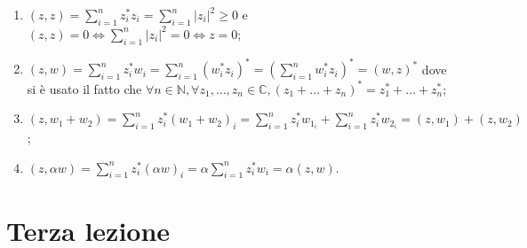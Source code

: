 \documentclass[12pt, twoside, italian, openany]{book}
\begin{document}
	\begin{enumerate}[label=\protect\circled{\arabic*}]
		\item $(z, z) = \sum\limits_{i=1}^n z_i^* z_i = \sum\limits_{i=1}^n |z_i|^2 \geq 0$ e $(z, z) = 0 \iff \sum\limits_{i=1}^n |z_i|^2 = 0 \iff z=0$;
		\item $(z, w) = \sum\limits_{i=1}^n z_i^* w_i = \sum\limits_{i=1}^n (w_i^* z_i)^* = (\sum\limits_{i=1}^n w_i^* z_i)^* = (w, z)^*$ dove si è usato il fatto che $\forall n \in \mathbb{N}, \forall z_1, \ldots, z_n \in \mathbb{C}, (z_1 + \ldots + z_n)^* = z_1^* + \ldots + z_n^*$;
		\item $(z, w_1 + w_2) = \sum\limits_{i=1}^n z_i^* (w_1 + w_2)_i = \sum\limits_{i=1}^n z_i^* w_{{1}_i} + \sum\limits_{i=1}^n z_i^* w_{{2}_i} = (z, w_1) + (z, w_2)$;
		\item $(z, \alpha w) = \sum\limits_{i=1}^n z_i^* (\alpha w)_i = \alpha \sum\limits_{i=1}^n z_i^* w_i = \alpha (z, w)$.
 	\end{enumerate}

	\chapter{Terza lezione}
\end{document}

